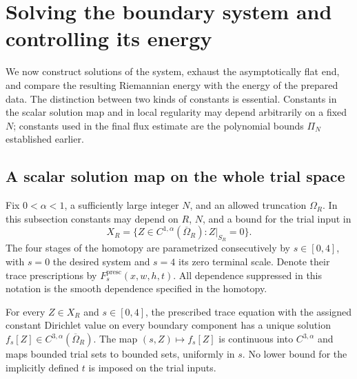 \section{Solving the boundary system and controlling its energy}\label{four:sec:existence}

We now construct solutions of the system, exhaust the asymptotically flat
end, and compare the resulting Riemannian energy with the energy of the
prepared data.  The distinction between two kinds of constants is essential.
Constants in the scalar solution map and in local regularity may depend
arbitrarily on a fixed $N$; constants used in the final flux estimate are
the polynomial bounds $\Pi_N$ established earlier.

\subsection{A scalar solution map on the whole trial space}

Fix $0<\alpha<1$, a sufficiently large integer $N$, and an allowed
truncation $\Omega_R$.  In this subsection constants may depend on $R$,
$N$, and a bound for the trial input in
\[
 X_R=\{Z\in C^{1,\alpha}(\overline\Omega_R):Z|_{S_R}=0\}.
\]
The four stages of the homotopy are parametrized consecutively by
$s\in[0,4]$, with $s=0$ the desired system and $s=4$ its zero terminal
scale.  Denote their trace prescriptions by
$F_s^{\mathrm{presc}}(x,w,h,t)$.  All dependence suppressed in this
notation is the smooth dependence specified in the homotopy.

\begin{lemma}\label{four:ex:scalar-trial}
For every $Z\in X_R$ and $s\in[0,4]$, the prescribed trace equation with
the assigned constant Dirichlet value on every boundary component has a
unique solution $f_s[Z]\in C^{3,\alpha}(\overline\Omega_R)$.  The map
$(s,Z)\mapsto f_s[Z]$ is continuous into $C^{3,\alpha}$ and maps bounded
trial sets to bounded sets, uniformly in $s$.  No lower bound for the
implicitly defined $t$ is imposed on the trial inputs.
\end{lemma}

